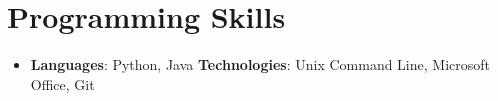 \documentclass[letterpaper,11pt]{article}
\newcommand{\resumeSubHeadingListStart}{\begin{itemize}[leftmargin=*]}
\newcommand{\resumeSubHeadingListEnd}{\end{itemize}}
\begin{document}
\section{Programming Skills}
 \resumeSubHeadingListStart
   \item{
     \textbf{Languages}{: Python, Java}
     \hfill
     \textbf{Technologies}{: Unix Command Line, Microsoft Office, Git}
   }
 \resumeSubHeadingListEnd


\end{document}
